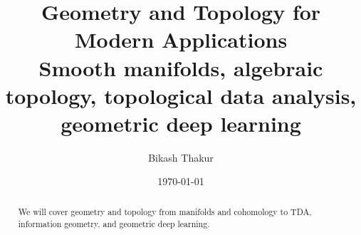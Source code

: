 \documentclass[11pt]{article}
\title{%
{\sffamily\huge\bfseries\color{DarkNavy} Geometry and Topology for Modern Applications}\\[6pt]
{\sffamily\large\color{AccentGray} Smooth manifolds, algebraic topology, topological data analysis, geometric deep learning}
}
\author{{\sffamily Bikash Thakur}}
\date{{\sffamily\small\color{AccentGray} \today}}
\begin{document}
\pagecolor{OffWhite}
\color{DarkNavy}

\maketitle
\thispagestyle{plain}

\begin{abstract}
\noindent
We will cover geometry and topology from manifolds and cohomology to TDA, information geometry, and geometric deep learning.
\end{abstract}

\tableofcontents
\newpage



\printindex
\end{document}

